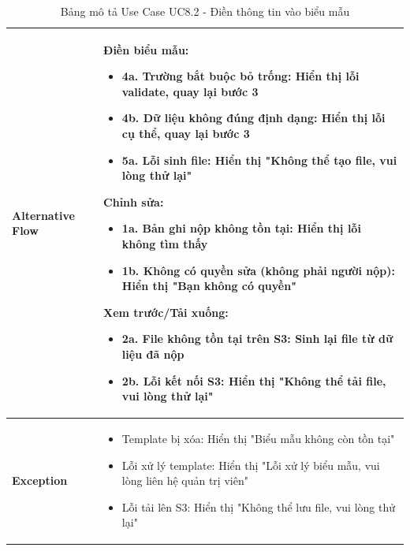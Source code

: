     \newpage
    \begin{table}[H]
    \renewcommand{\arraystretch}{1.3}
    \begin{tabular}{|m{}|m{}|}
    \hline
    \textbf{Alternative Flow} 
    & \textbf{Điền biểu mẫu:}
    \begin{itemize}
        \item \textbf{4a.} Trường bắt buộc bỏ trống: Hiển thị lỗi validate, quay lại bước 3
        \item \textbf{4b.} Dữ liệu không đúng định dạng: Hiển thị lỗi cụ thể, quay lại bước 3
        \item \textbf{5a.} Lỗi sinh file: Hiển thị "Không thể tạo file, vui lòng thử lại"
    \end{itemize}

    \textbf{Chỉnh sửa:}
    \begin{itemize}
        \item \textbf{1a.} Bản ghi nộp không tồn tại: Hiển thị lỗi không tìm thấy
        \item \textbf{1b.} Không có quyền sửa (không phải người nộp): Hiển thị "Bạn không có quyền"
    \end{itemize}

    \textbf{Xem trước/Tải xuống:}
    \begin{itemize}
        \item \textbf{2a.} File không tồn tại trên S3: Sinh lại file từ dữ liệu đã nộp
        \item \textbf{2b.} Lỗi kết nối S3: Hiển thị "Không thể tải file, vui lòng thử lại"
    \end{itemize}
    \\ \hline

    \textbf{Exception} 
    & \begin{itemize}
        \item Template bị xóa: Hiển thị "Biểu mẫu không còn tồn tại"
        \item Lỗi xử lý template: Hiển thị "Lỗi xử lý biểu mẫu, vui lòng liên hệ quản trị viên"
        \item Lỗi tải lên S3: Hiển thị "Không thể lưu file, vui lòng thử lại"
    \end{itemize}
    \\ \hline
    \end{tabular}
    \caption{Bảng mô tả Use Case UC8.2 - Điền thông tin vào biểu mẫu}
    \end{table}
